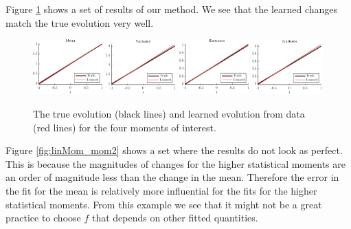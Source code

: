 \documentclass[11pt,letterpaper]{article}
\begin{document}
Figure \ref{fig:linMom_mom} shows a set of results of our method. We see that the learned changes match the true evolution very well. 
\begin{figure}
    \centering
    \includegraphics[width = 0.24\textwidth]{figs/linMom_mean}
    \includegraphics[width = 0.24\textwidth]{figs/linMom_var}
    \includegraphics[width = 0.24\textwidth]{figs/linMom_skew}
    \includegraphics[width = 0.24\textwidth]{figs/linMom_kurt}
    \caption{The true evolution (black lines) and learned evolution from data (red lines) for the four moments of interest.}
    \label{fig:linMom_mom}
\end{figure}
Figure \ref{fig:linMom_mom2} shows a set where the results do not look as perfect. This is because the magnitudes of changes for the higher statistical moments are an order of magnitude less than the change in the mean. Therefore the error in the fit for the mean is relatively more influential for the fits for the higher statistical moments. From this example we see that it might not be a great practice to choose $f$ that depends on other fitted quantities.
\end{document}
